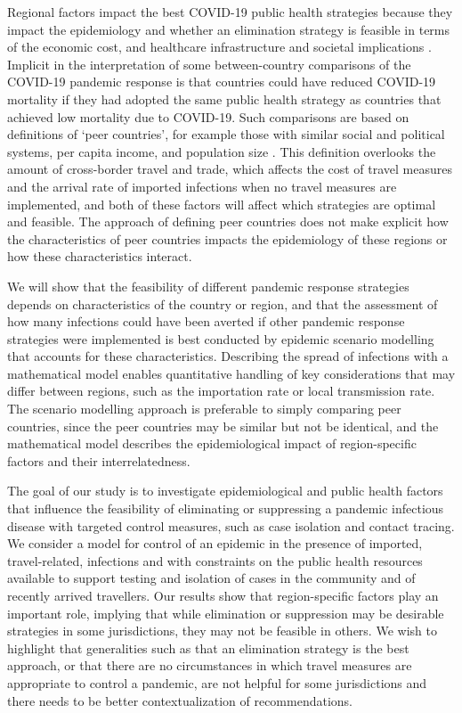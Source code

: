 \documentclass[pdflatex]{sn-jnl}
\theoremstyle{thmstyleone}%
\theoremstyle{thmstyletwo}%
\theoremstyle{thmstylethree}%
\begin{document}
Regional factors impact the best COVID-19 public health strategies because they impact the epidemiology and whether an elimination strategy is feasible in terms of the economic cost, and healthcare infrastructure and societal implications \citep{martignoni_is_2024}. Implicit in the interpretation of some between-country comparisons of the COVID-19 pandemic response is that countries could have reduced COVID-19 mortality if they had adopted the same public health strategy as countries that achieved low mortality due to COVID-19. Such comparisons are based on definitions of `peer countries', for example those with similar social and political systems, per capita income, and population size \citep{razak}. This definition overlooks the amount of cross-border travel and trade, which affects the cost of travel measures and the arrival rate of imported infections when no travel measures are implemented, and both of these factors will affect which strategies are optimal and feasible. The approach of defining peer countries does not make explicit how the characteristics of peer countries impacts the epidemiology of these regions or how these characteristics interact.

We will show that the feasibility of different pandemic response strategies depends on characteristics of the country or region, and that the assessment of how many infections could have been averted if other pandemic response strategies were implemented is best conducted by epidemic scenario modelling that accounts for these characteristics. Describing the spread of infections with a mathematical model enables quantitative handling of key considerations that may differ between regions, such as the importation rate or local transmission rate. The scenario modelling approach is preferable to simply comparing peer countries, since the peer countries may be similar but not be identical, and the mathematical model describes the epidemiological impact of region-specific factors and their interrelatedness.

The goal of our study is to investigate epidemiological and public health factors that influence the feasibility of eliminating or suppressing a pandemic infectious disease with targeted control measures, such as case isolation and contact tracing. We consider a model for control of an epidemic in the presence of imported, travel-related, infections and with constraints on the public health resources available to support testing and isolation of cases in the community and of recently arrived travellers. Our results show that region-specific factors play an important role, implying that while elimination or suppression may be desirable strategies in some jurisdictions, they may not be feasible in others.  We wish to highlight that generalities such as that an elimination strategy is the best approach, or that there are no circumstances in which travel measures are appropriate to control a pandemic, are not helpful for some jurisdictions and there needs to be better contextualization of recommendations.
\end{document}
